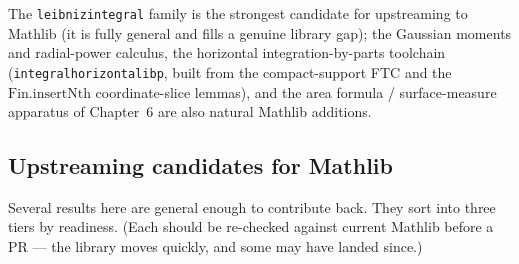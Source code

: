 ﻿\documentclass[12pt, a4paper]{article}
\renewcommand{\_}{\origunderscore\allowbreak}
\theoremstyle{definition}
\theoremstyle{plain}
\begin{document}
The \texttt{leibniz\_integral} family is the strongest candidate for upstreaming to Mathlib
(it is fully general and fills a genuine library gap); the Gaussian moments and radial-power
calculus, the horizontal integration-by-parts toolchain
(\texttt{integral\_horizontal\_ibp}, built from the compact-support FTC and the
$\mathrm{Fin.insertNth}$ coordinate-slice lemmas), and the area formula / surface-measure
apparatus of Chapter~6 are also natural Mathlib additions.

\subsection{Upstreaming candidates for Mathlib}

Several results here are general enough to contribute back. They sort into three tiers by
readiness. (Each should be re-checked against current Mathlib before a PR --- the library moves
quickly, and some may have landed since.)
\end{document}
